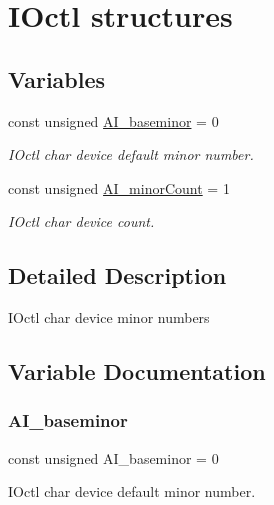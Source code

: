 \hypertarget{group__IOctl__maj__min}{}\section{I\+Octl structures}
\label{group__IOctl__maj__min}
\subsection*{Variables}
\begin{DoxyCompactItemize}
\item 
const unsigned \hyperlink{group__IOctl__maj__min_gadb180b9acab27a834b1d191b2ee1f39f}{A\+I\+\_\+baseminor} = 0
\begin{DoxyCompactList}\small\item\em I\+Octl char device default minor number. \end{DoxyCompactList}\item 
const unsigned \hyperlink{group__IOctl__maj__min_ga4a9b77eb24590cec68a0b899808b608f}{A\+I\+\_\+minor\+Count} = 1
\begin{DoxyCompactList}\small\item\em I\+Octl char device count. \end{DoxyCompactList}\end{DoxyCompactItemize}


\subsection{Detailed Description}
I\+Octl char device minor numbers 

\subsection{Variable Documentation}
\mbox{\label{group__IOctl__maj__min_gadb180b9acab27a834b1d191b2ee1f39f}} 
\subsubsection{\texorpdfstring{A\+I\+\_\+baseminor}{AI\_baseminor}}
{\footnotesize\ttfamily const unsigned A\+I\+\_\+baseminor = 0}



I\+Octl char device default minor number. 

